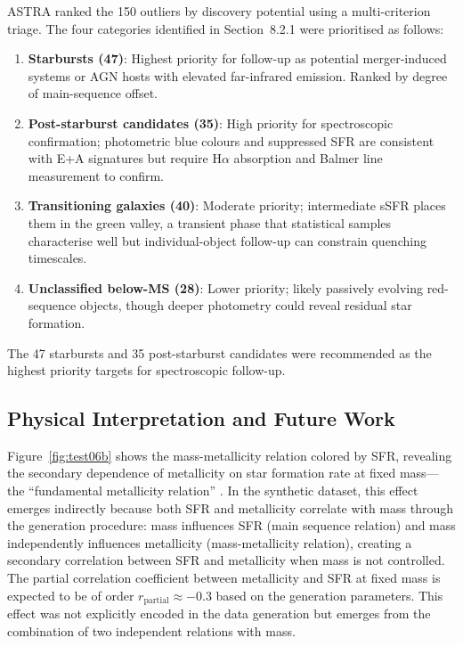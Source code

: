 \documentclass[usenatbib]{rasti}
\begin{document}
ASTRA ranked the 150 outliers by discovery potential using a multi-criterion triage. The four categories identified in Section~8.2.1 were prioritised as follows:

\begin{enumerate}
\item \textbf{Starbursts (47)}: Highest priority for follow-up as potential merger-induced systems or AGN hosts with elevated far-infrared emission. Ranked by degree of main-sequence offset.
\item \textbf{Post-starburst candidates (35)}: High priority for spectroscopic confirmation; photometric blue colours and suppressed SFR are consistent with E+A signatures but require H$\alpha$ absorption and Balmer line measurement to confirm.
\item \textbf{Transitioning galaxies (40)}: Moderate priority; intermediate sSFR places them in the green valley, a transient phase that statistical samples characterise well but individual-object follow-up can constrain quenching timescales.
\item \textbf{Unclassified below-MS (28)}: Lower priority; likely passively evolving red-sequence objects, though deeper photometry could reveal residual star formation.
\end{enumerate}

The 47 starbursts and 35 post-starburst candidates were recommended as the highest priority targets for spectroscopic follow-up.

\subsection{Physical Interpretation and Future Work}

Figure~\ref{fig:test06b} shows the mass-metallicity relation colored by SFR, revealing the secondary dependence of metallicity on star formation rate at fixed mass---the ``fundamental metallicity relation'' \cite{mannucci2010}. In the synthetic dataset, this effect emerges indirectly because both SFR and metallicity correlate with mass through the generation procedure: mass influences SFR (main sequence relation) and mass independently influences metallicity (mass-metallicity relation), creating a secondary correlation between SFR and metallicity when mass is not controlled. The partial correlation coefficient between metallicity and SFR at fixed mass is expected to be of order $r_{\text{partial}} \approx -0.3$ based on the generation parameters. This effect was not explicitly encoded in the data generation but emerges from the combination of two independent relations with mass.
\end{document}
